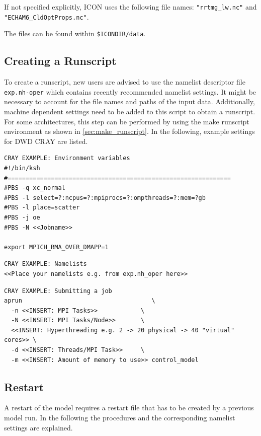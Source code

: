 If not specified explicitly, ICON uses the following file names: \newline 
\verb+"rrtmg_lw.nc"+ and \newline
\verb+"ECHAM6_CldOptProps.nc"+.

The files can be found within \verb+$ICONDIR/data+.

\subsection{Creating a Runscript}

To create a runscript, new users are advised to use the namelist descriptor file \verb+exp.nh-oper+ which contains recently recommended namelist settings. It might be necessary to account for the file names and paths of the input data. Additionally, machine dependent settings need to be added to this script to obtain a runscript. For some architectures, this step can be performed by using the make runscript environment as shown in \ref{sec:make_runscript}. In the following, example settings for DWD CRAY are listed.

\begin{Verbatim}[frame=single]
CRAY EXAMPLE: Environment variables
#!/bin/ksh
#==============================================================
#PBS -q xc_normal
#PBS -l select=?:ncpus=?:mpiprocs=?:ompthreads=?:mem=?gb
#PBS -l place=scatter
#PBS -j oe
#PBS -N <<Jobname>>

export MPICH_RMA_OVER_DMAPP=1
\end{Verbatim}

\begin{Verbatim}[frame=single]
CRAY EXAMPLE: Namelists
<<Place your namelists e.g. from exp.nh_oper here>>
\end{Verbatim}

\begin{Verbatim}[frame=single]
CRAY EXAMPLE: Submitting a job
aprun                                    \
  -n <<INSERT: MPI Tasks>>            \
  -N <<INSERT: MPI Tasks/Node>>       \
  <<INSERT: Hyperthreading e.g. 2 -> 20 physical -> 40 "virtual" cores>> \
  -d <<INSERT: Threads/MPI Task>>     \
  -m <<INSERT: Amount of memory to use>> control_model
\end{Verbatim}


\subsection{Restart}

A restart of the model requires a restart file that has to be created by a 
previous model run. In the following the procedures and the corresponding namelist settings are explained.

